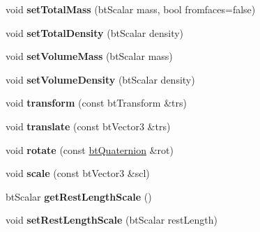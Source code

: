 \begin{DoxyCompactItemize}
\item 
\hypertarget{classbt_soft_body_ad7fa51cdee5753af58c3d7cf5c15330f}{void {\bfseries set\+Total\+Mass} (bt\+Scalar mass, bool fromfaces=false)}\label{classbt_soft_body_ad7fa51cdee5753af58c3d7cf5c15330f}

\item 
\hypertarget{classbt_soft_body_a6018d917b0eee5dc61c4d5cc66a6ceb2}{void {\bfseries set\+Total\+Density} (bt\+Scalar density)}\label{classbt_soft_body_a6018d917b0eee5dc61c4d5cc66a6ceb2}

\item 
\hypertarget{classbt_soft_body_a65a3db52b7fe9c869cb85577d292833d}{void {\bfseries set\+Volume\+Mass} (bt\+Scalar mass)}\label{classbt_soft_body_a65a3db52b7fe9c869cb85577d292833d}

\item 
\hypertarget{classbt_soft_body_a79bfb08e24aa77bdd08db4ee7853b544}{void {\bfseries set\+Volume\+Density} (bt\+Scalar density)}\label{classbt_soft_body_a79bfb08e24aa77bdd08db4ee7853b544}

\item 
\hypertarget{classbt_soft_body_a7ab01480d2dcebf21db52e65d0d8b891}{void {\bfseries transform} (const bt\+Transform \&trs)}\label{classbt_soft_body_a7ab01480d2dcebf21db52e65d0d8b891}

\item 
\hypertarget{classbt_soft_body_af412dc4d210f98a36a14b2d17d80e00e}{void {\bfseries translate} (const bt\+Vector3 \&trs)}\label{classbt_soft_body_af412dc4d210f98a36a14b2d17d80e00e}

\item 
\hypertarget{classbt_soft_body_a45e297c3090eee78c3d539eadfa86a50}{void {\bfseries rotate} (const \hyperlink{classbt_quaternion}{bt\+Quaternion} \&rot)}\label{classbt_soft_body_a45e297c3090eee78c3d539eadfa86a50}

\item 
\hypertarget{classbt_soft_body_a2a6533511a6a6cbede9bacb5c9a5280c}{void {\bfseries scale} (const bt\+Vector3 \&scl)}\label{classbt_soft_body_a2a6533511a6a6cbede9bacb5c9a5280c}

\item 
\hypertarget{classbt_soft_body_acaa15e077df8edbac940db7f3f982965}{bt\+Scalar {\bfseries get\+Rest\+Length\+Scale} ()}\label{classbt_soft_body_acaa15e077df8edbac940db7f3f982965}

\item 
\hypertarget{classbt_soft_body_a3e1ada2e78146ba2414ac2581dd4f460}{void {\bfseries set\+Rest\+Length\+Scale} (bt\+Scalar rest\+Length)}\label{classbt_soft_body_a3e1ada2e78146ba2414ac2581dd4f460}


\end{DoxyCompactItemize}
